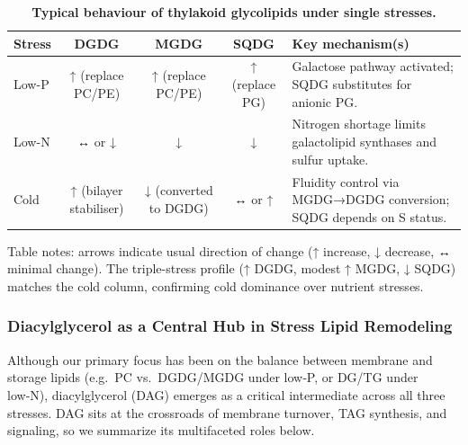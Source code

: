 \documentclass[10pt,letterpaper]{article}
\begin{document}
\begin{table}[!ht]
  \begin{adjustwidth}{-2.25in}{0in}  %
    \centering
    \caption{{\bf Typical behaviour of thylakoid glycolipids under single stresses.}}
    \begin{tabular}{|l|c|c|c|p{3.8in}|}
      \hline
      \textbf{Stress} & \textbf{DGDG} & \textbf{MGDG} & \textbf{SQDG} &
      \textbf{Key mechanism(s)} \\ \hline
      Low-P  & ↑ (replace PC/PE) & ↑ (replace PC/PE) & ↑ (replace PG) &
      Galactose pathway activated; SQDG substitutes for anionic PG. \\ \hline
      Low-N  & ↔ or ↓ & ↓ & ↓ &
      Nitrogen shortage limits galactolipid synthases and sulfur uptake. \\ \hline
      Cold   & ↑ (bilayer stabiliser) & ↓ (converted to DGDG) & ↔ or ↑ &
      Fluidity control via MGDG→DGDG conversion; SQDG depends on S status. \\ \hline
    \end{tabular}
    \begin{flushleft}
      Table notes: arrows indicate usual direction of change (↑ increase, ↓ decrease, ↔ minimal change).  
      The triple-stress profile (↑ DGDG, modest ↑ MGDG, ↓ SQDG) matches the cold column, confirming cold dominance over nutrient stresses.
    \end{flushleft}
    \label{table:triad_single_stress}
  \end{adjustwidth}
\end{table}

\subsubsection*{Diacylglycerol as a Central Hub in Stress Lipid Remodeling}

Although our primary focus has been on the balance between membrane and storage lipids (e.g.\ PC vs.\ DGDG/MGDG under low‑P, or DG/TG under low‑N), diacylglycerol (DAG) emerges as a critical intermediate across all three stresses. DAG sits at the crossroads of membrane turnover, TAG synthesis, and signaling, so we summarize its multifaceted roles below.
\end{document}
